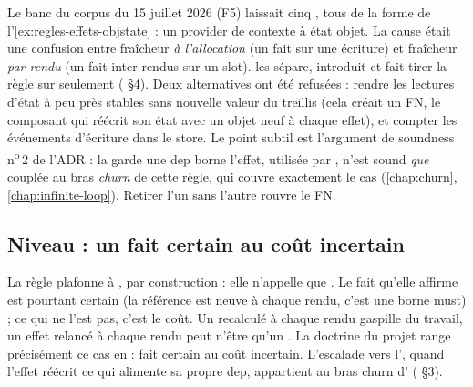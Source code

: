 \begin{decision}
Le banc du corpus du 15 juillet 2026 (\og F5\fg{}) laissait cinq \Warning{} , tous de la forme de l'\cref{ex:regles-effets-objstate} : un provider de contexte à état objet. La cause était une confusion entre fraîcheur \emph{à l'allocation} (un fait sur une écriture) et fraîcheur \emph{par rendu} (un fait inter-rendus sur un slot).  les sépare, introduit  et fait tirer la règle sur  seulement ( §4). Deux alternatives ont été refusées : rendre les lectures d'état \og à peu près stables\fg{} sans nouvelle valeur du treillis (cela créait un FN, le composant  qui réécrit son état avec un objet neuf à chaque effet), et compter les événements d'écriture dans le store. Le point subtil est l'argument de soundness n\textsuperscript{o}\,2 de l'ADR : la garde \og une dep  borne l'effet\fg{}, utilisée par , n'est sound \emph{que} couplée au bras \emph{churn} de cette règle, qui couvre exactement le cas  (\cref{chap:churn}, \cref{chap:infinite-loop}). Retirer l'un sans l'autre rouvre le FN.
\end{decision}

\subsection{Niveau : un fait certain au coût incertain}

La règle plafonne à \Warning{}, par construction : elle n'appelle que . Le fait qu'elle affirme est pourtant certain (la référence est neuve à chaque rendu, c'est une borne must) ; ce qui ne l'est pas, c'est le coût. Un  recalculé à chaque rendu gaspille du travail, un effet relancé à chaque rendu peut n'être qu'un . La doctrine du projet range précisément ce cas en \Warning{} : \og fait certain au coût incertain\fg{}. L'escalade vers l'\Error{}, quand l'effet réécrit ce qui alimente sa propre dep, appartient au bras churn d' ( §3).

